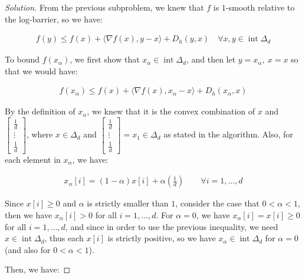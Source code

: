\documentclass{article}
\newenvironment{solution}
  {\renewcommand\qedsymbol{$\blacksquare$}\begin{proof}[Solution]}
  {\end{proof}}
\DeclareMathOperator{\interior}{int}
\begin{document}
\begin{solution}
From the previous subproblem, we knew that $f$ is $1$-smooth relative to the log-barrier, so we have:

\begin{align*}
    f(y) \leq f(x) + \langle \nabla f(x), y - x \rangle + D_h(y, x) \quad \forall x, y \in \interior \Delta_d
\end{align*}

To bound $f(x_\alpha)$, we first show that $x_\alpha \in \interior \Delta_d$, 
and then let $y = x_\alpha, \ x = x$ so that we would have:

\begin{align*}
    f(x_\alpha) \leq f(x) + \langle \nabla f(x), x_\alpha - x \rangle + D_h(x_\alpha, x)
\end{align*}

By the definition of $x_\alpha$, we knew that it is the convex combination of $x$ and $\begin{bmatrix}
    \frac{1}{d} \\
    \vdots \\
    \frac{1}{d}
\end{bmatrix}$, 
where $x \in \Delta_d$ and $\begin{bmatrix}
    \frac{1}{d} \\
    \vdots \\
    \frac{1}{d}
\end{bmatrix} = x_1 \in \Delta_d$ as stated in the algorithm.
\bigskip
Also, for each element in $x_\alpha$, we have:

\begin{align*}
    x_\alpha[i] = (1 - \alpha) x[i] + \alpha \left( \frac{1}{d} \right) \qquad \forall i = 1, \dots, d
\end{align*}

Since $x[i] \geq 0$ and $\alpha$ is strictly smaller than $1$,
consider the case that $0 < \alpha < 1$, then we have $x_\alpha[i] > 0$ for all $i = 1, \dots, d$.
For $\alpha = 0$, we have $x_\alpha[i] = x[i] \geq 0$ for all $i = 1, \dots, d$,
and since in order to use the previous inequality, we need $x \in \interior \Delta_d$,
thus each $x[i]$ is strictly positive, so we have $x_\alpha \in \interior \Delta_d$ 
for $\alpha = 0$ (and also for $0 < \alpha < 1$).
\bigskip



\bigskip

Then, we have:


\end{solution}
\end{document}
